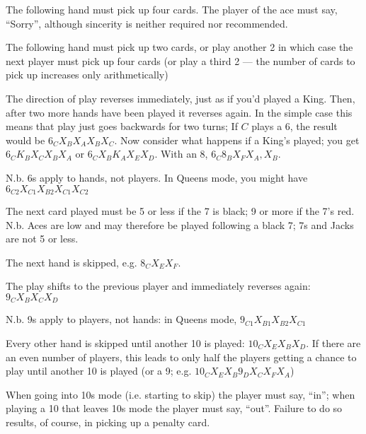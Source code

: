 \documentclass[12pt]{article}
\begin{document}
\begin{description}
\newcommand{\card}[1]{\hbox to 15mm{#1\hfil}}
\item[\card{Ace}]
  The following hand must pick up four cards.  The player of the ace must say, ``Sorry'', although sincerity is neither required nor recommended.

  \item[\card{2}]
    The following hand must pick up two cards, or play another 2 in which case the next player must
    pick up four cards (or play a third 2 --- the number of cards to pick up increases only arithmetically)

  \item[\card{6}]
    The direction of play reverses immediately, just as if you'd played a King.  Then, after two
    more hands have been played it reverses again.  In the simple case this means that play just goes backwards
    for two turns; If $C$ plays
    a 6, the result would be $6_C X_B X_A X_B X_C$.  Now consider what happens if a
    King's played;  you get $6_C K_B X_C X_B X_A$ or $6_C X_B K_A X_E X_D$.  With an 8,
    $6_C 8_B X_F X_A, X_B$.

    N.b. 6s apply to hands, not players.  In Queens mode, you might have $6_{C2} X_{C1} X_{B2} X_{C1} X_{C2}$

  \item[\card{7}] The next card played must be 5 or less if the 7 is black; 9 or more if the 7's red.  N.b. Aces are low
    and may therefore be played following a black 7; 7s and Jacks are not 5 or less.

  \item[\card{8}]
    The next hand is skipped, e.g. $8_C X_E X_F$.

  \item[\card{9}]
    The play shifts to the previous player and immediately reverses again: $9_C X_B X_C X_D$

    N.b. 9s apply to players, not hands: in Queens mode, $9_{C1} X_{B1} X_{B2} X_{C1}$

  \item[\card{10}]
    Every other hand is skipped until another 10 is played: $10_C X_E X_B X_D$.  If there are an even number of
    players, this leads to only half the players getting a chance to play until another
    10 is played (or a 9; e.g.  $10_C X_E X_B 9_D X_C X_F X_A$)

    When going into 10s mode (i.e. starting to skip) the player must say, ``in''; when playing a
    10 that leaves 10s mode the player must say, ``out''.  Failure to do so results, of course,
    in picking up a penalty card.


\end{description}
\end{document}
